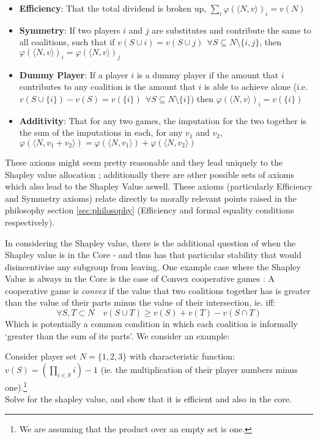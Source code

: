 \begin{itemize}
\item	\textbf{Efficiency}: That the total dividend is broken up, $\sum_i\varphi(\langle N,v\rangle)_i = v(N)$
\item	\textbf{Symmetry}: If two players $i$ and $j$ are substitutes and contribute the same to all coalitions, such that if $v(S\cup i)=v(S\cup j)~~\forall S\subseteq N\setminus\{i,j\}$, then $\varphi(\langle N,v\rangle)_i = \varphi(\langle N,v\rangle)_j$
\item	\textbf{Dummy Player}: If a player $i$ is a dummy player if the amount that $i$ contributes to any coalition is the amount that $i$ is able to achieve alone (i.e.\ $v(S\cup \{i\})-v(S)=v(\{i\})~~\forall S\subseteq N\setminus\{i\}$) then $\varphi(\langle N,v\rangle)_i=v(\{i\})$
\item	\textbf{Additivity}: That for any two games, the imputation for the two together is the sum of the imputations in each, for any $v_1$ and $v_2$, $\varphi(\langle N,v_1+v_2\rangle)=\varphi(\langle N,v_1 \rangle) + \varphi(\langle N,v_2\rangle)$
\end{itemize}

These axioms might seem pretty reasonable and they lead uniquely to the Shapley value allocation \cite{Shapley1953a}; additionally there are other possible sets of axioms which also lead to the Shapley Value aswell.
These axioms (particularly Efficiency and Symmetry axioms) relate directly to morally relevant points raised in the philosophy section \ref{sec:philosophy} (Efficiency and formal equality conditions respectively).

In considering the Shapley value, there is the additional question of when the Shapley value is in the Core - and thus has that particular stability that would disincentivise any subgroup from leaving.
One example case where the Shapley Value is always in the Core is the case of Convex cooperative games \cite[Chapter 6]{RePEc:cup:cbooks:9781107691322}:
A cooperative game is \textit{convex} if the value that two coalitions together has is greater than the value of their parts minus the value of their intersection, ie. iff:
\begin{equation}
    \forall S,T\subset N \quad v(S\cup T) \ge v(S)+v(T)-v(S\cap T)
\end{equation}
Which is potentially a common condition in which each coalition is informally `greater than the sum of its parts'.
We consider an example:

\begin{example}
Consider player set $N=\{1,2,3\}$ with characteristic function:\\
$v(S)=\left(\prod_{i\in S}i\right)-1$ (ie. the multiplication of their player numbers minus one).\footnote{We are assuming that the product over an empty set is one.}\\
Solve for the shapley value, and show that it is efficient and also in the core.
\end{example}

